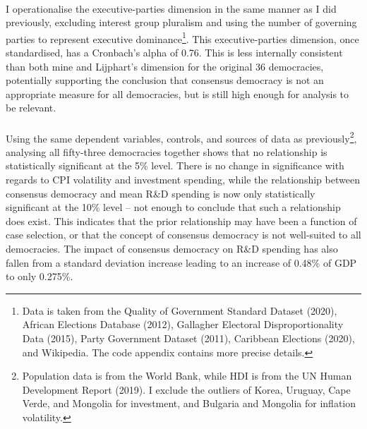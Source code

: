 \documentclass[11pt, oneside]{article}   	%
\let\oldparagraph\paragraph
\renewcommand{\paragraph}[1]{\oldparagraph{#1}\mbox{}}
\begin{document}
\paragraph{}
I operationalise the executive-parties dimension in the same manner as I did previously, excluding interest group pluralism and using the number of governing parties to represent executive dominance\footnote{  Data is taken from the Quality of Government Standard Dataset (2020), African Elections Database (2012), Gallagher Electoral Disproportionality Data (2015), Party Government Dataset (2011), Caribbean Elections (2020), and Wikipedia. The code appendix contains more precise details.}. This executive-parties dimension, once standardised, has a Cronbach’s alpha of 0.76. This is less internally consistent than both mine and Lijphart’s dimension for the original 36 democracies, potentially supporting the conclusion that consensus democracy is not an appropriate measure for all democracies, but is still high enough for analysis to be relevant.

\paragraph{}
Using the same dependent variables, controls, and sources of data as previously\footnote{Population data is from the World Bank, while HDI is from the UN Human Development Report (2019). I exclude the outliers of Korea, Uruguay, Cape Verde, and Mongolia for investment, and Bulgaria and Mongolia for inflation volatility.}, analysing all fifty-three democracies together shows that no relationship is statistically significant at the 5\% level. There is no change in significance with regards to CPI volatility and investment spending, while the relationship between consensus democracy and mean R\&D spending is now only statistically significant at the 10\% level – not enough to conclude that such a relationship does exist. This indicates that the prior relationship may have been a function of case selection, or that the concept of consensus democracy is not well-suited to all democracies. The impact of consensus democracy on R\&D spending has also fallen from a standard deviation increase leading to an increase of 0.48\% of GDP to only 0.275\%.
\end{document}
